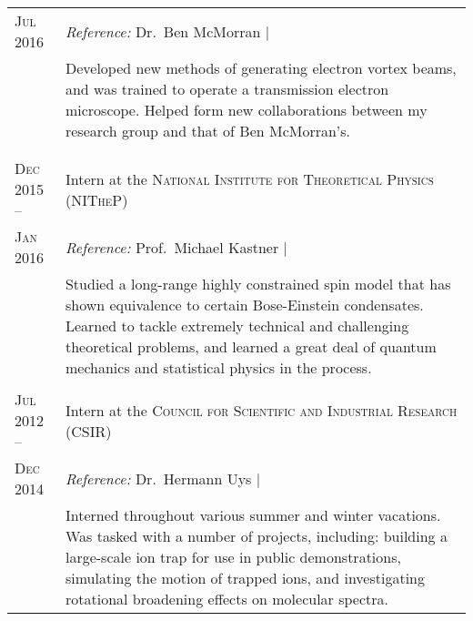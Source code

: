 \begin{supertabular}{p{1.8cm}|p{12cm}}
	\textsc{Jul 2016}			& \emph{Reference:} Dr.\ Ben McMorran | \\
	 							& \footnotesize{Developed new methods of generating electron vortex beams, and was trained to operate a transmission electron microscope. Helped form new collaborations between my research group and that of Ben McMorran’s.}\\
	 \\
	 \\  %
	\textsc{Dec 2015 --} 		& Intern at the \textsc{National Institute for Theoretical Physics (NITheP)} \\
	\textsc{Jan 2016} 			& \emph{Reference:} Prof.\ Michael Kastner | \\
	 							& \footnotesize{Studied a long-range highly constrained spin model that has shown equivalence to certain Bose-Einstein condensates. Learned to tackle extremely technical and challenging theoretical problems, and learned a great deal of quantum mechanics and statistical physics in the process.}\\
	 \\
	\textsc{Jul 2012 --} 		& Intern at the \textsc{Council for Scientific and Industrial Research (CSIR)} \\
	\textsc{Dec 2014}			& \emph{Reference:} Dr.\ Hermann Uys | \\
	 							& \footnotesize{Interned throughout various summer and winter vacations. Was tasked with a number of projects, including: building a large-scale ion trap for use in public demonstrations, simulating the motion of trapped ions, and investigating rotational broadening effects on molecular spectra.} \\
\end{supertabular}